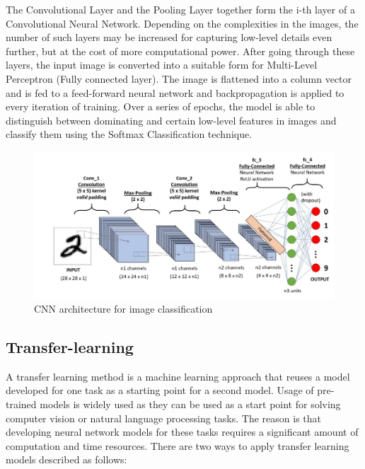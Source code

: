     The Convolutional Layer and the Pooling Layer together form the i-th layer of a Convolutional Neural Network. Depending on the complexities in the images, the number of such layers may be increased for capturing low-level details even further, but at the cost of more computational power. 
    After going through these layers, the input image is converted into a suitable form for Multi-Level Perceptron (Fully connected layer). The image is flattened into a column vector and  is fed to a feed-forward neural network and backpropagation is applied to every iteration of training. Over a series of epochs, the model is able to distinguish between dominating and certain low-level features in images and classify them using the Softmax Classification technique.
      \begin{figure}[h]
      	\centering
      	\includegraphics[width=1\linewidth]{images/cnn.png}
      	\caption{CNN architecture for image classification \cite{imgcnn}}
      	\label{l00}	
      \end{figure}
    
    \subsection{Transfer-learning}
    A transfer learning method is a machine learning approach that reuses a model developed for one task as a starting point for a second model. Usage of pre-trained models is widely used as they can be used as a start point for solving computer vision or natural language processing tasks. The reason is that developing neural network models for these tasks requires a significant amount of computation and time resources. There are two ways to apply transfer learning models described as follows:
    

